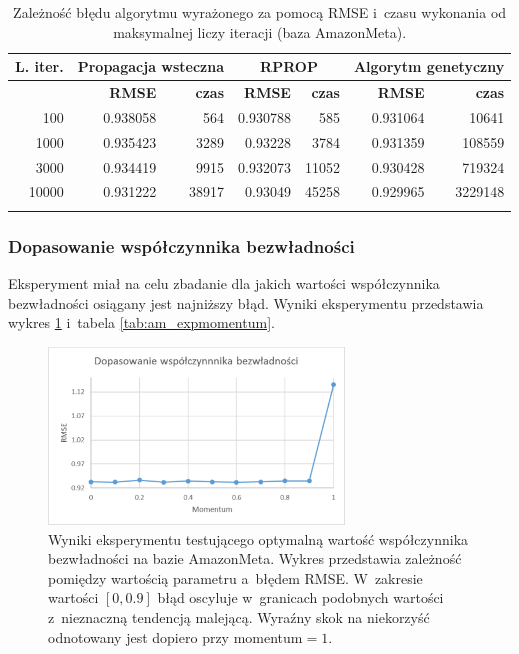 \documentclass[twoside]{iisthesis}
\begin{document}
			\begin{longtable}[H]{r||rr|rr|rr}		
				\label{tab:am_expiterations}		
				\textbf{L. iter.} & \multicolumn{2}{c|}{\textbf{Propagacja wsteczna}}  & \multicolumn{2}{c|}{\textbf{RPROP}} & \multicolumn{2}{c}{\textbf{Algorytm genetyczny}}  \\
				\hline
				& \textbf{RMSE} & \textbf{czas} & \textbf{RMSE} & \textbf{czas} & \textbf{RMSE} & \textbf{czas} \\
				\hline
				100   & 0.938058 & 564   & 0.930788 & 585   & 0.931064 & 10641   \\
				1000  & 0.935423 & 3289  & 0.93228  & 3784  & 0.931359 & 108559  \\
				3000  & 0.934419 & 9915  & 0.932073 & 11052 & 0.930428 & 719324  \\
				10000 & 0.931222 & 38917 & 0.93049  & 45258 & 0.929965 & 3229148 \\
				\caption{Zależność błędu algorytmu wyrażonego za pomocą RMSE i~czasu wykonania od maksymalnej liczy iteracji (baza AmazonMeta).}
			\end{longtable}
			
			\subsubsection{Dopasowanie współczynnika bezwładności} 
			
			Eksperyment miał na celu zbadanie dla jakich wartości współczynnika bezwładności osiągany jest najniższy błąd. Wyniki eksperymentu przedstawia wykres \ref{fig:am_expmomentum} i~tabela \ref{tab:am_expmomentum}. 
			
			\begin{figure}[H]
				\centering
				\includegraphics[width=0.7\textwidth]{am_expmomentum}			
				\caption{Wyniki eksperymentu testującego optymalną wartość współczynnika bezwładności na bazie AmazonMeta. Wykres przedstawia zależność pomiędzy wartością parametru a~błędem RMSE. W~zakresie wartości $[0,0.9]$ błąd oscyluje w~granicach podobnych wartości z~nieznaczną tendencją malejącą. Wyraźny skok na niekorzyść odnotowany jest dopiero przy momentum$=1$.}
				\label{fig:am_expmomentum}
			\end{figure}
			
\end{document}
